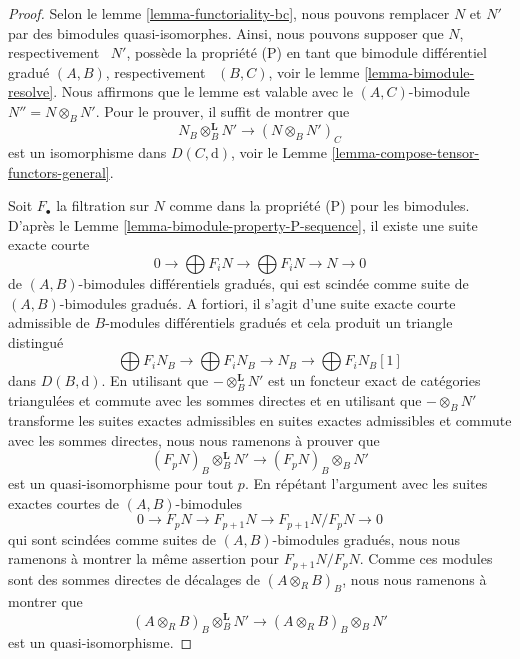 \begin{proof}
Selon le lemme \ref{lemma-functoriality-bc}, nous pouvons remplacer $N$ et $N'$
par des bimodules quasi-isomorphes. Ainsi, nous pouvons supposer que $N$,
respectivement \ $N'$, possède la propriété (P) en tant que bimodule différentiel
gradué $(A, B)$, respectivement \ $(B, C)$, voir le lemme
\ref{lemma-bimodule-resolve}. Nous affirmons que le lemme est valable avec le
$(A, C)$-bimodule $N'' = N \otimes_B N'$. Pour le prouver, il suffit de montrer
que
$$
N_B \otimes_B^\mathbf{L} N' \longrightarrow (N \otimes_B N')_C
$$
est un isomorphisme dans $D(C, \text{d})$, voir le Lemme
\ref{lemma-compose-tensor-functors-general}.

\medskip\noindent
Soit $F_\bullet$ la filtration sur $N$ comme dans la propriété (P) pour les
bimodules. D'après le Lemme \ref{lemma-bimodule-property-P-sequence}, il existe
une suite exacte courte
$$
0 \to
\bigoplus\nolimits F_iN \to
\bigoplus\nolimits F_iN \to N \to 0
$$
de $(A, B)$-bimodules différentiels gradués, qui est scindée comme suite de
$(A, B)$-bimodules gradués. A fortiori, il s'agit d'une suite exacte courte
admissible de $B$-modules différentiels gradués et cela produit un triangle
distingué
$$
\bigoplus\nolimits F_iN_B \to
\bigoplus\nolimits F_iN_B \to N_B \to
\bigoplus\nolimits F_iN_B[1]
$$
dans $D(B, \text{d})$. En utilisant que $- \otimes_B^\mathbf{L} N'$ est un
foncteur exact de catégories triangulées et commute avec les sommes directes et en
utilisant que $- \otimes_B N'$ transforme les suites exactes admissibles en suites
exactes admissibles et commute avec les sommes directes, nous nous ramenons à
prouver que
$$
(F_pN)_B \otimes_B^\mathbf{L} N' \longrightarrow (F_pN)_B \otimes_B N'
$$
est un quasi-isomorphisme pour tout $p$. En répétant l'argument avec les suites
exactes courtes de $(A, B)$-bimodules
$$
0 \to F_pN \to F_{p + 1}N \to F_{p + 1}N/F_pN \to 0
$$
qui sont scindées comme suites de $(A, B)$-bimodules gradués, nous nous ramenons à montrer
la même assertion pour $F_{p + 1}N/F_pN$. Comme ces modules sont des sommes
directes de décalages de $(A \otimes_R B)_B$, nous nous ramenons à montrer que
$$
(A \otimes_R B)_B \otimes_B^\mathbf{L} N'
\longrightarrow
(A \otimes_R B)_B \otimes_B N'
$$
est un quasi-isomorphisme.


\end{proof}
